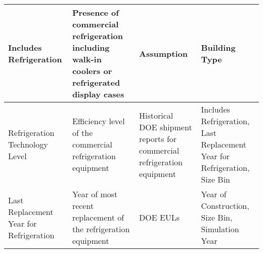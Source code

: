 \begin{center}
\begin{longtable}{|p{1.3in}|p{1.5in}|p{1.5in}|p{1.5in}|}
Includes Refrigeration                                          & Presence of commercial refrigeration including walk-in coolers or refrigerated display cases & Assumption                                     & Building Type                                                                            \\ \hline
Refrigeration Technology Level                                  & Efficiency level of the commercial refrigeration equipment                     & Historical DOE shipment reports for commercial refrigeration equipment & Includes Refrigeration, Last Replacement Year for Refrigeration, Size Bin        \\ \hline
Last Replacement Year for Refrigeration                         & Year of most recent replacement of the refrigeration equipment                           & DOE EULs                                                   & Year of Construction, Size Bin, Simulation Year                                              \\ \hline
\end{longtable}
\end{center}